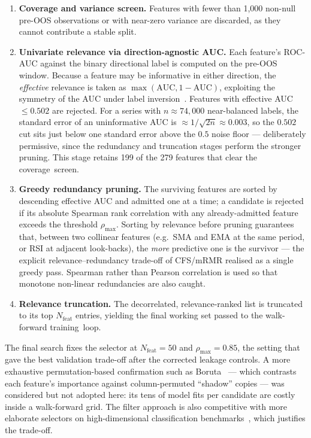 \begin{enumerate}
    \item \textbf{Coverage and variance screen.} Features with fewer than 1{,}000 non-null pre-OOS observations or with near-zero variance are discarded, as they cannot contribute a stable split.
    \item \textbf{Univariate relevance via direction-agnostic AUC.} Each feature's ROC-AUC against the binary directional label is computed on the pre-OOS window. Because a feature may be informative in either direction, the \textit{effective} relevance is taken as $\max(\text{AUC}, 1-\text{AUC})$, exploiting the symmetry of the AUC under label inversion~\cite{fawcett2006introduction}. Features with effective AUC $\leq 0.502$ are rejected. For a series with $n \approx 74{,}000$ near-balanced labels, the standard error of an uninformative AUC is $\approx 1/\sqrt{2n} \approx 0.003$, so the $0.502$ cut sits just below one standard error above the $0.5$ noise floor --- deliberately permissive, since the redundancy and truncation stages perform the stronger pruning. This stage retains 199 of the 279 features that clear the coverage~screen.
    \item \textbf{Greedy redundancy pruning.} The surviving features are sorted by descending effective AUC and admitted one at a time; a candidate is rejected if its absolute Spearman rank correlation with any already-admitted feature exceeds the threshold $\rho_{\max}$. Sorting by relevance before pruning guarantees that, between two collinear features (e.g.\ SMA and EMA at the same period, or RSI at adjacent look-backs), the \textit{more} predictive one is the survivor --- the explicit relevance--redundancy trade-off of CFS/mRMR realised as a single greedy pass. Spearman rather than Pearson correlation is used so that monotone non-linear redundancies are also caught.
    \item \textbf{Relevance truncation.} The decorrelated, relevance-ranked list is truncated to its top $N_{\text{feat}}$ entries, yielding the final working set passed to the walk-forward training~loop.
\end{enumerate}

The final search fixes the selector at $N_{\text{feat}}=50$ and $\rho_{\max}=0.85$, the setting that gave the best validation trade-off after the corrected leakage controls. A more exhaustive permutation-based confirmation such as Boruta~\cite{kursa2010feature} --- which contrasts each feature's importance against column-permuted ``shadow'' copies --- was considered but not adopted here: its tens of model fits per candidate are costly inside a walk-forward grid. The filter approach is also competitive with more elaborate selectors on high-dimensional classification benchmarks~\cite{bommert2020benchmark}, which justifies the trade-off.

